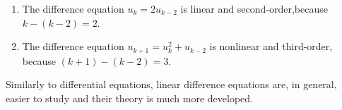 \hfill

\begin{example}
\begin{enumerate}
	\item The difference equation $u_{k} = 2 u_{k-2}$ is linear and second-order,because $k-(k-2) = 2$.
	\item The difference equation $u_{k+1} =  u_{k}^2+u_{k-2}$ is nonlinear and third-order, because $(k+1)-(k-2) = 3$.
\end{enumerate}	
\end{example}



Similarly to differential equations, linear difference equations are, in general, easier to study and their theory is much more developed.


